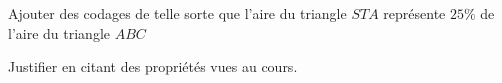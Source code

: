 
\begin{exercice}\label{exo2smath-0252}

    Ajouter des codages de telle sorte que l'aire du triangle \( STA\) représente \( 25\%\) de l'aire du triangle \( ABC\)



    Justifier en citant des propriétés vues au cours.

\end{exercice}
